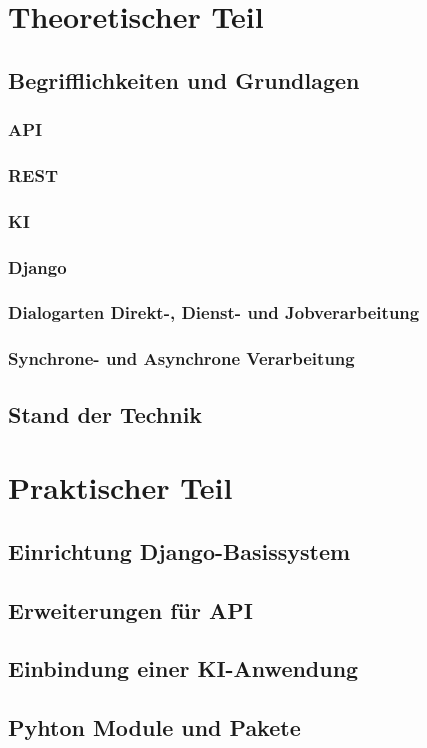 \documentclass[12pt,oneside,titlepage,listof=totoc,bibliography=totoc]{scrartcl}
\begin{document}
\section{Theoretischer Teil}
 \subsection{Begrifflichkeiten und Grundlagen}
  \subsubsection{API}
  \subsubsection{REST}
  \subsubsection{KI}
  \subsubsection{Django}
  \subsubsection{Dialogarten Direkt-, Dienst- und Jobverarbeitung}
  \subsubsection{Synchrone- und Asynchrone Verarbeitung}
 \subsection{Stand der Technik}

\section{Praktischer Teil}
 \subsection{Einrichtung Django-Basissystem }
 \subsection{Erweiterungen für API}
 \subsection{Einbindung einer KI-Anwendung}
  \subsection{Pyhton Module und Pakete}
\end{document}
